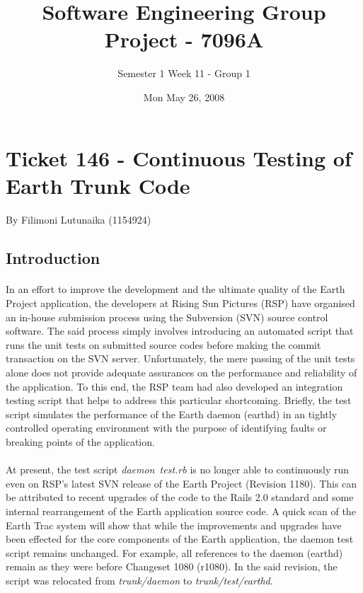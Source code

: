 \documentclass[oneside, 10pt, a4]{article}
\begin{document}
\title{Software Engineering Group Project - 7096A}
\author{Semester 1 Week 11 - Group 1}
\date{Mon May 26, 2008}

\maketitle

\section*{Ticket 146 - Continuous Testing of Earth Trunk Code}

\paragraph{} By Filimoni Lutunaika (1154924)


\subsection*{Introduction}

\paragraph{}
In an effort to improve the development and the ultimate quality of the Earth Project application, 
the developers at Rising Sun Pictures (RSP) have organised an in-house submission process using 
the Subversion (SVN) source control software. The said process simply involves introducing an automated
script that runs the unit tests on submitted source codes before making the commit transaction on the
SVN server. Unfortunately, the mere passing of the unit tests alone does not provide adequate assurances 
on the performance and reliability of the application. To this end, the RSP team had also developed an 
integration testing script that helps to address this particular shortcoming. Briefly, the test script 
simulates the performance of the Earth daemon (earthd) in an tightly controlled operating environment
with the purpose of identifying faults or breaking points of the application.

\paragraph{}
At present, the test script \emph{daemon\
test.rb} is no longer able to continuously run even on RSP's latest 
SVN release of the Earth Project (Revision 1180). This can be attributed to recent upgrades of the code to the
Rails 2.0 standard and some internal rearrangement of the Earth application source code. A quick scan of the 
Earth Trac system will show that while the improvements and upgrades have been effected for the core components
of the Earth application, the daemon test script remains unchanged. For example, all references to the daemon
(earthd) remain as they were before Changeset 1080 (r1080). In the said revision, the script was relocated from 
\textit{trunk/daemon} to \textit{trunk/test/earthd}.
\end{document}
